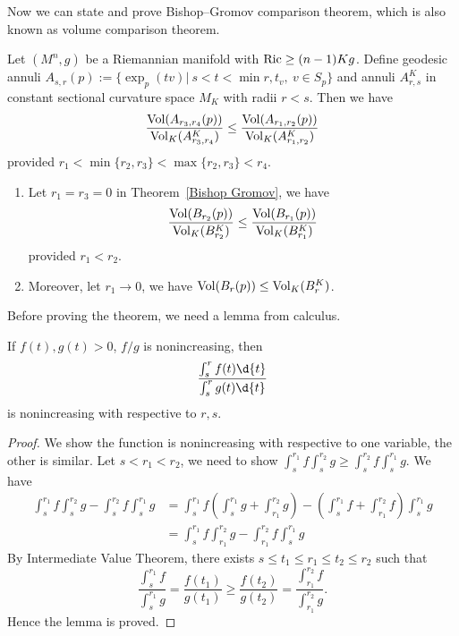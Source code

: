 Now we can state and prove Bishop--Gromov comparison theorem, which is also known as volume comparison theorem.
\begin{thm}\label{Bishop Gromov}
    Let $(M^n,g)$ be a Riemannian manifold with $\operatorname{Ric}\geq(n-1)Kg$.
    Define geodesic annuli $A_{s,r}(p):=\{\exp_p(tv)|\ s<t<\min{r,t_v},\ v\in S_p\}$ and annuli $A^K_{r,s}$ in constant sectional curvature space $M_K$ with radii $r<s$.
    Then we have
    \[\frac{\operatorname{Vol}(A_{r_3,r_4}(p))}{\operatorname{Vol}_K(A^K_{r_3,r_4})}\leq\frac{\operatorname{Vol}(A_{r_1,r_2}(p))}{\operatorname{Vol}_K(A^K_{r_1,r_2})}\]
    provided $r_1<\min\{r_2,r_3\}<\max\{r_2,r_3\}<r_4$.
\end{thm}

\begin{cor}
    \begin{enumerate}[(1)]
        \item Let $r_1=r_3=0$ in Theorem~\ref{Bishop Gromov}, we have
        \[\frac{\operatorname{Vol}(B_{r_2}(p))}{\operatorname{Vol}_K(B_{r_2}^K)}\leq\frac{\operatorname{Vol}(B_{r_1}(p))}{\operatorname{Vol}_K(B_{r_1}^K)}\]
        provided $r_1<r_2$.
        \item Moreover, let $r_1\to 0$, we have $\operatorname{Vol}(B_r(p))\leq\operatorname{Vol}_K(B_r^K)$.
    \end{enumerate}
\end{cor}

Before proving the theorem, we need a lemma from calculus.
\begin{lem}
    If $f(t),g(t)>0$, $f/g$ is nonincreasing, then
    \[\frac{\int_s^rf(t)\d{t}}{\int_s^rg(t)\d{t}}\]
    is nonincreasing with respective to $r,s$.
\end{lem}
\begin{proof}
    We show the function is nonincreasing with respective to one variable, the other is similar.
    Let $s<r_1<r_2$, we need to show $\int_s^{r_1}f\int_s^{r_2}g\geq\int_s^{r_2}f\int_s^{r_1}g$.
    We have
    \begin{align*}
        \int_s^{r_1}f\int_s^{r_2}g-\int_s^{r_2}f\int_s^{r_1}g&=\int_s^{r_1}f\left(\int_s^{r_1}g+\int_{r_1}^{r_2}g\right)-\left(\int_s^{r_1}f+\int_{r_1}^{r_2}f\right)\int_s^{r_1}g\\
        &=\int_s^{r_1}f\int_{r_1}^{r_2}g-\int_{r_1}^{r_2}f\int_s^{r_1}g
    \end{align*}
    By Intermediate Value Theorem, there exists $s\leq t_1\leq r_1\leq t_2\leq r_2$ such that
    \[\frac{\int_s^{r_1}f}{\int_s^{r_1}g}=\frac{f(t_1)}{g(t_1)}\geq\frac{f(t_2)}{g(t_2)}=\frac{\int_{r_1}^{r_2}f}{\int_{r_1}^{r_2}g}.\]
    Hence the lemma is proved.
\end{proof}

